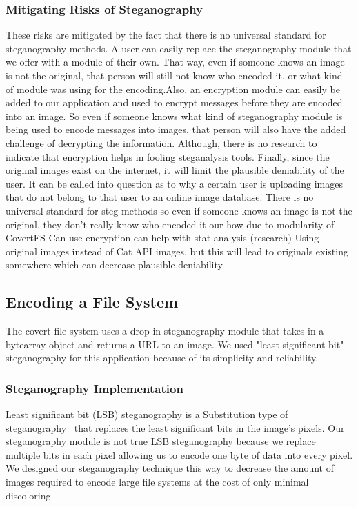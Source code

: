 \subsubsection{Mitigating Risks of Steganography}
These risks are mitigated by the fact that there is no universal standard for steganography methods. A user can easily replace the steganography module that we offer with a module of their own. That way, even if someone knows an image is not the original, that person will still not know who encoded it, or what kind of module was using for the encoding.Also, an encryption module can easily be added to our application and used to encrypt messages before they are encoded into an image. So even if someone knows what kind of steganography module is being used to encode messages into images, that person will also have the added challenge of decrypting the information. Although, there is no research to indicate that encryption helps in fooling steganalysis tools. Finally, since the original images exist on the internet, it will limit the plausible deniability of the user. It can be called into question as to why a certain user is uploading images that do not belong to that user to an online image database. 
There is no universal standard for steg methods
		so even if someone knows an image is not the original, they don't really know who encoded it our how due to modularity of CovertFS
	Can use encryption
		can help with stat analysis (research)
Using original images instead of Cat API images, but this will lead to originals existing somewhere which can decrease plausible deniability 

\subsection{Encoding a File System}

The covert file system uses a drop in steganography module that takes in a bytearray object and returns a URL to an image. We used "least significant bit" steganography for this application because of its simplicity and reliability.

\subsubsection{Steganography Implementation}

Least significant bit (LSB) steganography is a Substitution type of steganography~\cite{Nosrati2011} that replaces the least significant bits in the image's pixels. Our steganography module is not true LSB steganography because we replace multiple bits in each pixel allowing us to encode one byte of data into every pixel. We designed our steganography technique this way to decrease the amount of images required to encode large file systems at the cost of only minimal discoloring. 

